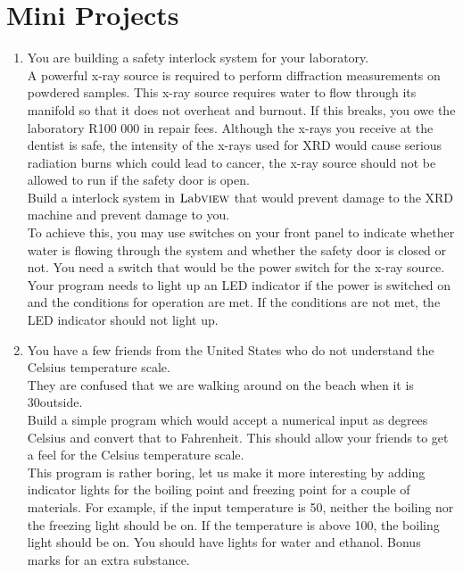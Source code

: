 	\pagebreak
	\section{Mini Projects}
	\begin{enumerate}
		\item You are building a safety interlock system for your laboratory.\\
		A powerful x-ray source is required to perform diffraction measurements on powdered samples. This x-ray source requires water to flow through its manifold so that it does not overheat and burnout. If this breaks, you owe the laboratory R100 000 in repair fees. Although the x-rays you receive at the dentist is safe, the intensity of the x-rays used for XRD would cause serious radiation burns which could lead to cancer, the x-ray source should not be allowed to run if the safety door is open.\\
		
		Build a interlock system in $\text{Lab}\textsc{view}$ that would prevent damage to the XRD machine and prevent damage to you.\\
		
		To achieve this, you may use switches on your front panel to indicate whether water is flowing through the system and whether the safety door is closed or not. You need a switch that would be the power switch for the x-ray source. Your program needs to light up an LED indicator if the power is switched on and the conditions for operation are met. If the conditions are not met, the LED indicator should not light up.
		
		\item You have a few friends from the United States who do not understand the Celsius temperature scale.\\
		They are confused that we are walking around on the beach when it is 30\textdegree outside.\\
		
		Build a simple program which would accept a numerical input as degrees Celsius and convert that to Fahrenheit. This should allow your friends to get a feel for the Celsius temperature scale.\\
		
		This program is rather boring, let us make it more interesting by adding indicator lights for the boiling point and freezing point for a couple of materials. For example, if the input temperature is 50\textdegree, neither the boiling nor the freezing light should be on. If the temperature is above 100\textdegree, the boiling light should be on. You should have lights for water and ethanol. Bonus marks for an extra substance.\\
	\end{enumerate}
	
	